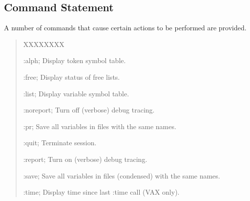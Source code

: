 \subsection{Command Statement}
A number of commands that cause certain actions to be performed are
provided.
\begin{quote}
\begin{describe}{XXXXXXXX}
\item[:alph;] Display token symbol table.
\item[:free;] Display status of free lists.
\item[:list;] Display variable symbol table.
\item[:noreport;] Turn off (verbose) debug tracing.
\item[:pr;] Save all variables in files with the same names.
\item[:quit;] Terminate session.
\item[:report;] Turn on (verbose) debug tracing.
\item[:save;] Save all variables in files (condensed) with the same names.
\item[:time;] Display time since last :time call (VAX only).
\end{describe}
\end{quote}
